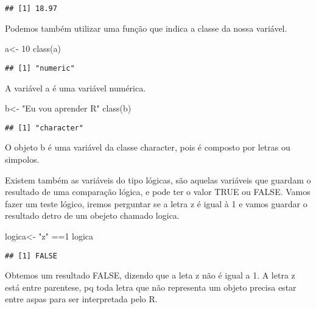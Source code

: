 \documentclass[
]{article}
\newenvironment{Shaded}{\begin{snugshade}}{\end{snugshade}}
\newcommand{\DecValTok}[1]{\textcolor[rgb]{0.00,0.00,0.81}{#1}}
\newcommand{\FunctionTok}[1]{\textcolor[rgb]{0.00,0.00,0.00}{#1}}
\newcommand{\NormalTok}[1]{#1}
\newcommand{\OtherTok}[1]{\textcolor[rgb]{0.56,0.35,0.01}{#1}}
\newcommand{\SpecialCharTok}[1]{\textcolor[rgb]{0.00,0.00,0.00}{#1}}
\newcommand{\StringTok}[1]{\textcolor[rgb]{0.31,0.60,0.02}{#1}}
\begin{document}
\begin{verbatim}
## [1] 18.97
\end{verbatim}

Podemos também utilizar uma função que indica a classe da nossa
variável.

\begin{Shaded}
\begin{Highlighting}[]
\NormalTok{a}\OtherTok{\textless{}{-}} \DecValTok{10}
\FunctionTok{class}\NormalTok{(a)}
\end{Highlighting}
\end{Shaded}

\begin{verbatim}
## [1] "numeric"
\end{verbatim}

A variável a é uma variável numérica.

\begin{Shaded}
\begin{Highlighting}[]
\NormalTok{b}\OtherTok{\textless{}{-}} \StringTok{"Eu vou aprender R"}
\FunctionTok{class}\NormalTok{(b)}
\end{Highlighting}
\end{Shaded}

\begin{verbatim}
## [1] "character"
\end{verbatim}

O objeto b é uma variável da classe character, pois é composto por
letras ou simpolos.

Existem também as variáveis do tipo lógicas, são aquelas variáveis que
guardam o resultado de uma comparação lógica, e pode ter o valor TRUE ou
FALSE. Vamos fazer um teste lógico, iremos perguntar se a letra z é
igual à 1 e vamos guardar o resultado detro de um obejeto chamado
logica.

\begin{Shaded}
\begin{Highlighting}[]
\NormalTok{logica}\OtherTok{\textless{}{-}} \StringTok{"z"} \SpecialCharTok{==}\DecValTok{1}
\NormalTok{logica}
\end{Highlighting}
\end{Shaded}

\begin{verbatim}
## [1] FALSE
\end{verbatim}

Obtemos um resultado FALSE, dizendo que a leta z não é igual a 1. A
letra z está entre parentese, pq toda letra que não representa um objeto
precisa estar entre aspas para ser interpretada pelo R.
\end{document}
